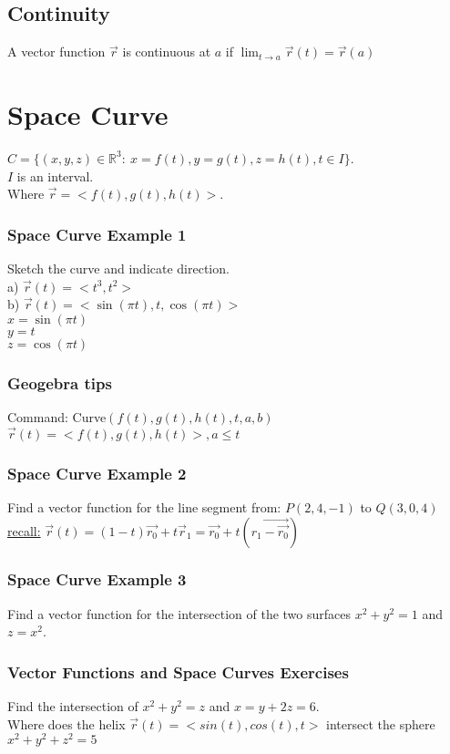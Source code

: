 \documentclass[12pt]{article}
\begin{document}
\subsection{Continuity}
A vector function $\vec{r}  $ is continuous at $a$ if $\lim_{t \to a} \vec{r} (t) = \vec{r} (a)  $

\section{Space Curve}
$C = \{(x,y,z)\in \mathbb{R}^3:\ x=f(t),y=g(t),z=h(t),t\in I\}$.\\%
$I$ is an interval.\\%
Where $\vec{r} =<f(t),g(t),h(t)>$.
\subsubsection{Space Curve Example 1}
Sketch the curve and indicate direction.\\%
a) $\vec{r} (t) = <t^3,t^2> $\\%
b) $\vec{r} (t)=<\sin{(\pi t)},t,\cos{(\pi t)}> $\\%
$x=\sin{(\pi t)}$\\%
$y=t$\\%
$z=\cos{(\pi t)}$\\%
\subsubsection{Geogebra tips}
Command: Curve$(f(t),g(t),h(t),t,a,b)$\\%
$\vec{r} (t)=<f(t),g(t),h(t)>,a\leq t $
\subsubsection{Space Curve Example 2}
Find a vector function for the line segment from:
$P(2,4,-1) $ to $Q(3,0,4)$\\%
\underline{recall:} $\vec{r}(t)=(1-t)\vec{r_0} +t \vec{r} _1   =\vec{r_0} +t(\vec{r_1-\vec{r_0}  }    )$
\subsubsection{Space Curve Example 3}
Find a vector function for the intersection of the two surfaces $x^2+y^2=1$ and	$z=x^2$.

\subsubsection{Vector Functions and Space Curves Exercises}
Find the intersection of $x^2+y^2=z$ and $x=y+2z=6$.\\%
Where does the helix $\vec{r} (t) = <sin(t),cos(t),t> $ intersect the sphere $x^2+y^2+z^2=5$
\end{document}
